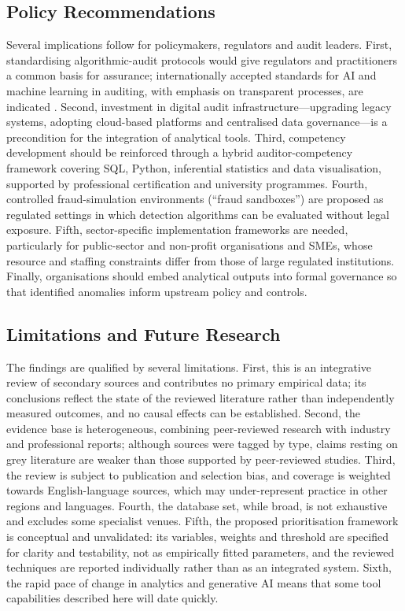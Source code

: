 \documentclass[conference]{IEEEtran}
\begin{document}
\subsection{Policy Recommendations}

Several implications follow for policymakers, regulators and audit leaders. First, standardising algorithmic-audit protocols would give regulators and practitioners a common basis for assurance; internationally accepted standards for AI and machine learning in auditing, with emphasis on transparent processes, are indicated \cite{b13}. Second, investment in digital audit infrastructure---upgrading legacy systems, adopting cloud-based platforms and centralised data governance---is a precondition for the integration of analytical tools. Third, competency development should be reinforced through a hybrid auditor-competency framework covering SQL, Python, inferential statistics and data visualisation, supported by professional certification and university programmes. Fourth, controlled fraud-simulation environments (``fraud sandboxes'') are proposed as regulated settings in which detection algorithms can be evaluated without legal exposure. Fifth, sector-specific implementation frameworks are needed, particularly for public-sector and non-profit organisations and SMEs, whose resource and staffing constraints differ from those of large regulated institutions. Finally, organisations should embed analytical outputs into formal governance so that identified anomalies inform upstream policy and controls.

\subsection{Limitations and Future Research}
\label{sec:limitations}

The findings are qualified by several limitations. First, this is an integrative review of secondary sources and contributes no primary empirical data; its conclusions reflect the state of the reviewed literature rather than independently measured outcomes, and no causal effects can be established. Second, the evidence base is heterogeneous, combining peer-reviewed research with industry and professional reports; although sources were tagged by type, claims resting on grey literature are weaker than those supported by peer-reviewed studies. Third, the review is subject to publication and selection bias, and coverage is weighted towards English-language sources, which may under-represent practice in other regions and languages. Fourth, the database set, while broad, is not exhaustive and excludes some specialist venues. Fifth, the proposed prioritisation framework is conceptual and unvalidated: its variables, weights and threshold are specified for clarity and testability, not as empirically fitted parameters, and the reviewed techniques are reported individually rather than as an integrated system. Sixth, the rapid pace of change in analytics and generative AI means that some tool capabilities described here will date quickly.
\end{document}
